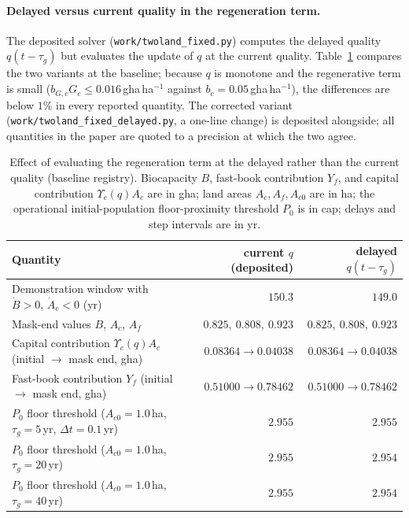 \documentclass[11pt,a4paper]{article}
\newcommand{\Ups}{\Upsilon_c}
\begin{document}
\paragraph{Delayed versus current quality in the regeneration term.} The deposited solver (\texttt{work/twoland\_fixed.py}) computes the delayed quality $q(t-\tau_g)$ but evaluates the update of $q$ at the current quality. Table~\ref{tab:si_delay} compares the two variants at the baseline; because $q$ is monotone and the regenerative term is small ($b_{G,c}G_c\le0.016$\,gha\,ha$^{-1}$ against $b_c=0.05$\,gha\,ha$^{-1}$), the differences are below $1\%$ in every reported quantity. The corrected variant (\texttt{work/twoland\_fixed\_delayed.py}, a one-line change) is deposited alongside; all quantities in the paper are quoted to a precision at which the two agree.

\begin{table}[htbp]
\centering\small
\caption{Effect of evaluating the regeneration term at the delayed rather than the current quality (baseline registry). Biocapacity $B$, fast-book contribution $Y_f$, and capital contribution $\Ups(q)A_c$ are in gha; land areas $A_c,A_f,A_{c0}$ are in ha; the operational initial-population floor-proximity threshold $P_0$ is in cap; delays and step intervals are in yr.}
\label{tab:si_delay}
\begin{tabular}{l r r}
\toprule
Quantity & current $q$ (deposited) & delayed $q(t-\tau_g)$ \\
\midrule
Demonstration window with $\dot B>0$, $\dot A_c<0$ (yr) & $150.3$ & $149.0$ \\
Mask-end values $B$, $A_c$, $A_f$ & $0.825,\ 0.808,\ 0.923$ & $0.825,\ 0.808,\ 0.923$ \\
Capital contribution $\Ups(q)A_c$ (initial $\to$ mask end, gha) & $0.08364\to0.04038$ & $0.08364\to0.04038$ \\
Fast-book contribution $Y_f$ (initial $\to$ mask end, gha) & $0.51000\to0.78462$ & $0.51000\to0.78462$ \\
$P_0$ floor threshold ($A_{c0}=1.0$\,ha, $\tau_g=5$\,yr, $\Delta t=0.1$\,yr) & $2.955$ & $2.955$ \\
$P_0$ floor threshold ($A_{c0}=1.0$\,ha, $\tau_g=20$\,yr) & $2.955$ & $2.954$ \\
$P_0$ floor threshold ($A_{c0}=1.0$\,ha, $\tau_g=40$\,yr) & $2.955$ & $2.954$ \\
\bottomrule
\end{tabular}
\end{table}
\end{document}
